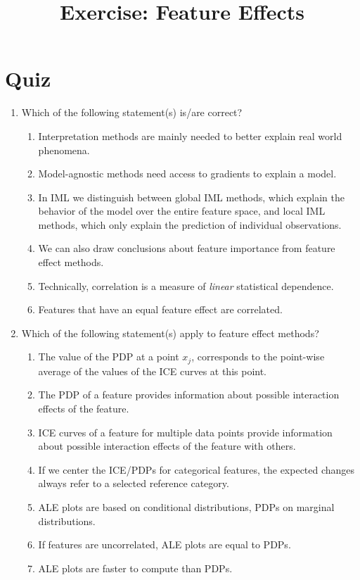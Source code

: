 \title{Exercise: Feature Effects}

\section{Quiz}

\begin{enumerate}
  \item Which of the following statement(s) is/are correct?  
        \begin{enumerate}
        \item Interpretation methods are mainly needed to better explain real world phenomena. 
        \item Model-agnostic methods need access to gradients to explain a model.
        \item In IML we distinguish between global IML methods, which explain the behavior of the model over the entire feature space, and local IML methods, which only explain the prediction of individual observations. 
        \item We can also draw conclusions about feature importance from feature effect methods.
        \item Technically, correlation is a measure of \textit{linear} statistical dependence.
        \item Features that have an equal feature effect are correlated.
        \end{enumerate}

\item Which of the following statement(s) apply to feature effect methods? 
        \begin{enumerate}
        \item The value of the PDP at a point $x_j$, corresponds to the point-wise average of the values of the ICE curves at this point. 
        \item The PDP of a feature provides information about possible interaction effects of the feature. 
        \item ICE curves of a feature for multiple data points provide information about possible interaction effects of the feature with others. 
        \item If we center the ICE/PDPs for categorical features, the expected changes always refer to a selected reference category. 
        \item ALE plots are based on conditional distributions, PDPs on marginal distributions.
        \item If features are uncorrelated, ALE plots are equal to PDPs. 
        \item ALE plots are faster to compute than PDPs.
        \end{enumerate}


\end{enumerate}
